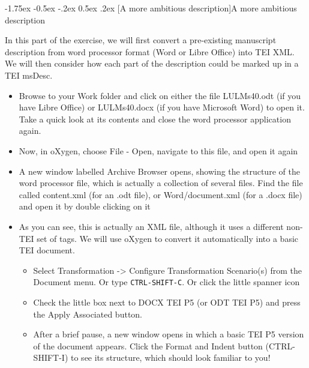 \documentclass[11pt,twoside]{article}\makeatletter
\makeatletter
\renewcommand\section{\@startsection {section}{1}{\z@}%
     {-1.75ex \@plus -0.5ex \@minus -.2ex}%
     {0.5ex \@plus .2ex}%
     {\reset@font\Large\bfseries\sffamily}}
\makeatother
\begin{document}
\section[{A more ambitious description}]{A more ambitious description}\par
In this part of the exercise, we will first convert a pre-existing manuscript description from word processor format (Word or Libre Office) into TEI XML. We will then consider how each part of the description could be marked up in a TEI msDesc. \begin{itemize}
\item Browse to your \textsf{Work} folder and click on either the file \textsf{LUL\textunderscore Ms40.odt} (if you have Libre Office) or \textsf{LUL\textunderscore Ms40.docx} (if you have Microsoft Word) to open it. Take a quick look at its contents and close the word processor application again.
\item Now, in oXygen, choose File - Open, navigate to this file, and open it again
\item A new window labelled \textsf{Archive Browser} opens, showing the structure of the word processor file, which is actually a collection of several files. Find the file called \textsf{content.xml} (for an .odt file), or \textsf{Word/document.xml} (for a .docx file) and open it by double clicking on it
\item As you can see, this is actually an XML file, although it uses a different non-TEI set of tags. We will use oXygen to convert it automatically into a basic TEI document. \begin{itemize}
\item  Select \textsf{Transformation -> Configure Transformation Scenario(s)} from the \textsf{Document} menu. Or type \texttt{CTRL-SHIFT-C}. Or click the little spanner icon
\item Check the little box next to DOCX TEI P5 (or ODT TEI P5) and press the \textsf{Apply Associated} button.
\item After a brief pause, a new window opens in which a basic TEI P5 version of the document appears. Click the Format and Indent button (CTRL-SHIFT-I) to see its structure, which should look familiar to you!
\end{itemize} 
\end{itemize} \par
\end{document}
